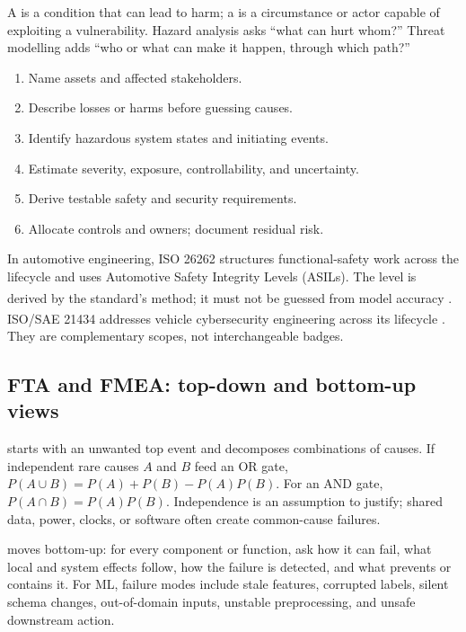 A  is a condition that can lead to harm; a  is
a circumstance or actor capable of exploiting a vulnerability. Hazard analysis
asks ``what can hurt whom?'' Threat modelling adds ``who or what can make it
happen, through which path?''

\begin{enumerate}
    \item Name assets and affected stakeholders.
    \item Describe losses or harms before guessing causes.
    \item Identify hazardous system states and initiating events.
    \item Estimate severity, exposure, controllability, and uncertainty.
    \item Derive testable safety and security requirements.
    \item Allocate controls and owners; document residual risk.
\end{enumerate}

In automotive engineering, ISO 26262 structures functional-safety work across
the lifecycle and uses Automotive Safety Integrity Levels (ASILs). The level is
derived by the standard's method; it must not be guessed from model accuracy
\textsuperscript{\cite{isoRoadVehiclesFunctional2018}}. ISO/SAE 21434 addresses
vehicle cybersecurity engineering across its lifecycle
\textsuperscript{\cite{isoRoadVehiclesCybersecurity2021}}. They are
complementary scopes, not interchangeable badges.

\subsection{FTA and FMEA: top-down and bottom-up views}

 starts with an unwanted top event and
decomposes combinations of causes. If independent rare causes $A$ and $B$ feed
an OR gate, $P(A\cup B)=P(A)+P(B)-P(A)P(B)$. For an AND gate,
$P(A\cap B)=P(A)P(B)$. Independence is an assumption to justify; shared data,
power, clocks, or software often create common-cause failures.

 moves bottom-up: for every
component or function, ask how it can fail, what local and system effects
follow, how the failure is detected, and what prevents or contains it. For ML,
failure modes include stale features, corrupted labels, silent schema changes,
out-of-domain inputs, unstable preprocessing, and unsafe downstream action.

